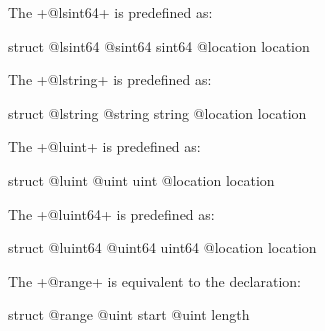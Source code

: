 
The \ggs+@lsint64+ is predefined as:
\begin{galgas}
struct @lsint64 {
  @sint64 sint64
  @location location
}
\end{galgas}








The \ggs+@lstring+ is predefined as:
\begin{galgas}
struct @lstring {
  @string string
  @location location
}
\end{galgas}








The \ggs+@luint+ is predefined as:
\begin{galgas}
struct @luint {
  @uint uint
  @location location
}
\end{galgas}






The \ggs+@luint64+ is predefined as:
\begin{galgas}
struct @luint64 {
  @uint64 uint64
  @location location
}
\end{galgas}



The \ggs+@range+ is equivalent to the declaration:
\begin{galgas}
struct @range {
  @uint start
  @uint length
}
\end{galgas}


